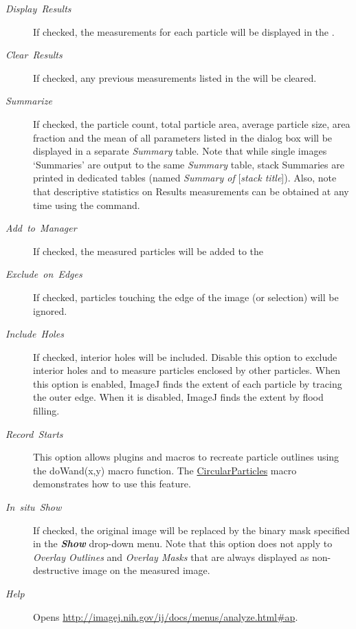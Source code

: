 \begin{description}
\item [{\emph{Display\ Results}}] If checked, the measurements for each
particle will be displayed in the . 
\item [{\emph{Clear\ Results}}] If checked, any previous measurements
listed in the  will be cleared.
\item [{\emph{Summarize}}] If checked, the particle
count, total particle area, average particle size, area fraction and
the mean of all parameters listed in the 
dialog box will be displayed in a separate \emph{Summary} table. Note
that while single images `Summaries' are output to the same \emph{Summary}
table, stack Summaries are printed in dedicated tables (named \emph{Summary
of }{[}\emph{stack title}{]}). Also, note that descriptive statistics
on Results measurements can be obtained at any time using the 
command. 
\item [{\emph{Add\ to\ Manager}}] If checked, the measured particles
will be added to the 
\item [{\emph{Exclude\ on\ Edges}}] If checked, particles touching the
edge of the image (or selection) will be ignored.
\item [{\emph{Include\ Holes}}] If checked, interior holes will be included.
Disable this option to exclude interior holes and to measure particles
enclosed by other particles. When this option is enabled, ImageJ finds
the extent of each particle by tracing the outer edge. When it is
disabled, ImageJ finds the extent by flood filling.
\item [{\emph{Record\ Starts}}] This option allows plugins and macros
to recreate particle outlines using the doWand(x,y) macro function.
The \href{http://imagej.nih.gov/ij/macros/CircularParticles.txt}{CircularParticles}
macro demonstrates how to use this feature.
\item [{\emph{In\ situ\ Show}}] If checked, the original image will be
replaced by the binary mask specified in the \textbf{\emph{Show}}
drop-down menu. Note that this option does not apply to \emph{Overlay
Outlines} and \emph{Overlay Masks} that are always displayed as non-destructive
image  on the measured image. 
\item [{\emph{Help}}] Opens \url{http://imagej.nih.gov/ij/docs/menus/analyze.html#ap}.
\end{description}

